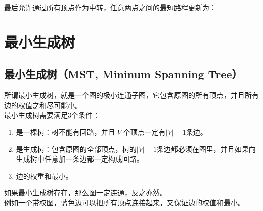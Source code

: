 最后允许通过所有顶点作为中转，任意两点之间的最短路程更新为：

\begin{table}[H]
	\centering
\end{table}

\newpage

\section{最小生成树}

\subsection{最小生成树（MST, Mininum Spanning Tree）}

所谓最小生成树，就是一个图的极小连通子图，它包含原图的所有顶点，并且所有边的权值之和尽可能小。\\

最小生成树需要满足3个条件：

\begin{enumerate}
	\item 是一棵树：树不能有回路，并且$ |V| $个顶点一定有$ |V| - 1 $条边。

	\item 是生成树：包含原图的全部顶点，树的$ |V| - 1 $条边都必须在图里，并且如果向生成树中任意加一条边都一定构成回路。

	\item 边的权重和最小。
\end{enumerate}

如果最小生成树存在，那么图一定连通，反之亦然。\\

例如一个带权图，蓝色边可以把所有顶点连接起来，又保证边的权值和最小。

